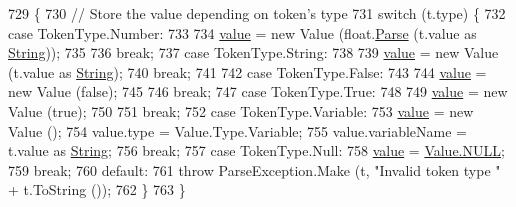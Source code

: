 \begin{DoxyCode}
729                                            \{
730                 \textcolor{comment}{// Store the value depending on token's type}
731                 \textcolor{keywordflow}{switch} (t.type) \{
732                 \textcolor{keywordflow}{case} TokenType.Number:
733 
734                     \hyperlink{a00164_a51ab5939344f9bfa21181c02cf0e341d}{value} = \textcolor{keyword}{new} Value (\textcolor{keywordtype}{float}.\hyperlink{a00123_a811cc7226f4f4a2f3440cdb67ad14468}{Parse} (t.value as \hyperlink{a00031_a301aa7c866593a5b625a8fc158bbeacea27118326006d3829667a400ad23d5d98}{String}));
735 
736                     \textcolor{keywordflow}{break};
737                 \textcolor{keywordflow}{case} TokenType.String:
738 
739                     \hyperlink{a00164_a51ab5939344f9bfa21181c02cf0e341d}{value} = \textcolor{keyword}{new} Value (t.value as \hyperlink{a00031_a301aa7c866593a5b625a8fc158bbeacea27118326006d3829667a400ad23d5d98}{String});
740                     \textcolor{keywordflow}{break};
741 
742                 \textcolor{keywordflow}{case} TokenType.False:
743 
744                     \hyperlink{a00164_a51ab5939344f9bfa21181c02cf0e341d}{value} = \textcolor{keyword}{new} Value (\textcolor{keyword}{false});
745 
746                     \textcolor{keywordflow}{break};
747                 \textcolor{keywordflow}{case} TokenType.True:
748 
749                     \hyperlink{a00164_a51ab5939344f9bfa21181c02cf0e341d}{value} = \textcolor{keyword}{new} Value (\textcolor{keyword}{true});
750 
751                     \textcolor{keywordflow}{break};
752                 \textcolor{keywordflow}{case} TokenType.Variable:
753                     \hyperlink{a00164_a51ab5939344f9bfa21181c02cf0e341d}{value} = \textcolor{keyword}{new} Value ();
754                     value.type = Value.Type.Variable;
755                     value.variableName = t.value as \hyperlink{a00031_a301aa7c866593a5b625a8fc158bbeacea27118326006d3829667a400ad23d5d98}{String};
756                     \textcolor{keywordflow}{break};
757                 \textcolor{keywordflow}{case} TokenType.Null:
758                     \hyperlink{a00164_a51ab5939344f9bfa21181c02cf0e341d}{value} = \hyperlink{a00163_a1ed2964965baca8621c45efa23f37660}{Value.NULL};
759                     \textcolor{keywordflow}{break};
760                 \textcolor{keywordflow}{default}:
761                     \textcolor{keywordflow}{throw} ParseException.Make (t, \textcolor{stringliteral}{"Invalid token type "} + t.ToString ());
762                 \}
763             \}
\end{DoxyCode}


